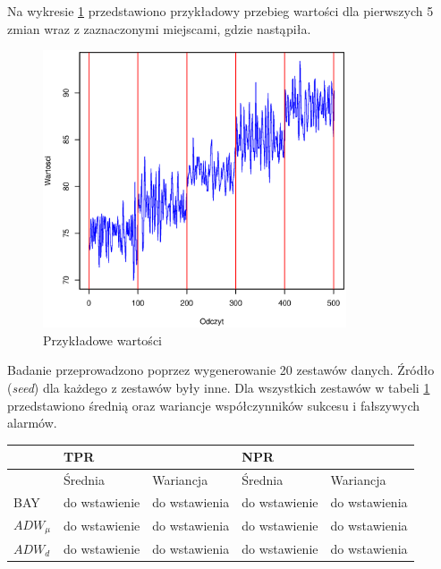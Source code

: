 Na wykresie \ref{fig:JumpingValues} przedstawiono przykładowy przebieg wartości dla pierwszych 5 zmian
wraz z zaznaczonymi miejscami,
gdzie nastąpiła.
\begin{figure}[htbp]
  \centering
  \includegraphics[width=0.8\textwidth]{img/ch-5-jumping}
  \caption{Przykładowe wartości}
  \label{fig:JumpingValues}
\end{figure}
Badanie przeprowadzono poprzez wygenerowanie 20 zestawów danych.
Źródło (\textit{seed}) dla każdego z zestawów były inne.
Dla wszystkich zestawów w tabeli \ref{tab:JumpingResult} przedstawiono średnią oraz wariancje współczynników sukcesu i fałszywych alarmów.
\begin{table}[h]
  \label{tab:JumpingResult}
  \centering
  \begin{tabular}{l r r r r}
    & \multicolumn{2}{l}{TPR} & \multicolumn{2}{l}{NPR} \\
    \hline
    & \multicolumn{1}{l}{Średnia} & \multicolumn{1}{l}{Wariancja}& \multicolumn{1}{l}{Średnia} & \multicolumn{1}{l}{Wariancja} \\
    \hline
    BAY & do wstawienie & do wstawienia & do wstawienie & do wstawienia \\
    $ADW_{\mu}$ & do wstawienie & do wstawienia & do wstawienie & do wstawienia \\
    $ADW_{d}$ & do wstawienie & do wstawienia & do wstawienie & do wstawienia \\
  \end{tabular}
\end{table}
